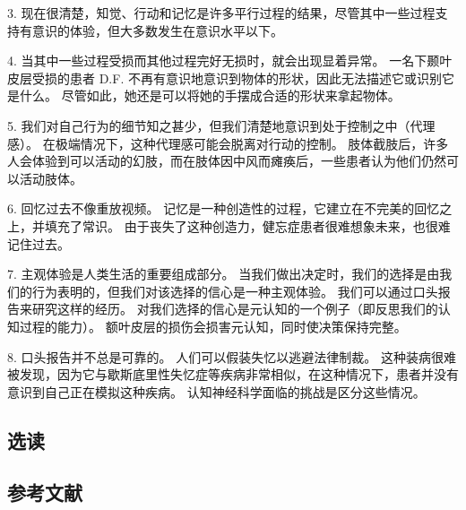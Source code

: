3. 现在很清楚，知觉、行动和记忆是许多平行过程的结果，尽管其中一些过程支持有意识的体验，但大多数发生在意识水平以下。 

4. 当其中一些过程受损而其他过程完好无损时，就会出现显着异常。 一名下颞叶皮层受损的患者 D.F. 不再有意识地意识到物体的形状，因此无法描述它或识别它是什么。 尽管如此，她还是可以将她的手摆成合适的形状来拿起物体。 

5. 我们对自己行为的细节知之甚少，但我们清楚地意识到处于控制之中（代理感）。 在极端情况下，这种代理感可能会脱离对行动的控制。 肢体截肢后，许多人会体验到可以活动的幻肢，而在肢体因中风而瘫痪后，一些患者认为他们仍然可以活动肢体。 

6. 回忆过去不像重放视频。 记忆是一种创造性的过程，它建立在不完美的回忆之上，并填充了常识。 由于丧失了这种创造力，健忘症患者很难想象未来，也很难记住过去。 

7. 主观体验是人类生活的重要组成部分。 当我们做出决定时，我们的选择是由我们的行为表明的，但我们对该选择的信心是一种主观体验。 我们可以通过口头报告来研究这样的经历。 对我们选择的信心是元认知的一个例子（即反思我们的认知过程的能力）。 额叶皮层的损伤会损害元认知，同时使决策保持完整。 

8. 口头报告并不总是可靠的。 人们可以假装失忆以逃避法律制裁。 这种装病很难被发现，因为它与歇斯底里性失忆症等疾病非常相似，在这种情况下，患者并没有意识到自己正在模拟这种疾病。 认知神经科学面临的挑战是区分这些情况。

\subsection{选读}
\subsection{参考文献}